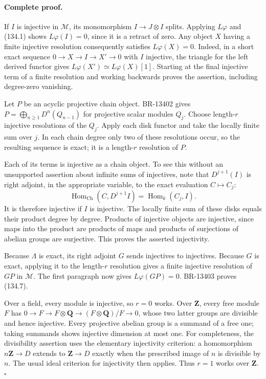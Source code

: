 \paragraph{Complete proof.}
If \(I\) is injective in \(\mathcal M\), its monomorphism
\(I\to J\otimes I\) splits.  Applying \(L\varphi\) and (134.1)
shows \(L\varphi(I)=0\), since it is a retract of zero.  Any object
\(X\) having a finite injective resolution consequently satisfies
\(L\varphi(X)=0\).  Indeed, in a short exact sequence
\(0\to X\to I\to X'\to0\) with \(I\) injective, the triangle for
the left derived functor gives
\(L\varphi(X')\simeq L\varphi(X)[1]\).  Starting at the final
injective term of a finite resolution and working backwards proves
the assertion, including degree-zero vanishing.

Let \(P\) be an acyclic projective chain object.  BR-13402 gives
\(P=\bigoplus_{n\geq1}D^n(Q_{n-1})\) for projective scalar
modules \(Q_j\).  Choose length-\(r\) injective resolutions of the
\(Q_j\).  Apply each disk functor and take the locally finite sum
over \(j\).  In each chain degree only two of these resolutions
occur, so the resulting sequence is exact; it is a length-\(r\)
resolution of \(P\).

Each of its terms is injective as a chain object.  To see this without
an unsupported assertion about infinite sums of injectives, note that
\(D^{j+1}(I)\) is right adjoint, in the appropriate variable, to
the exact evaluation \(C\mapsto C_j\):
\[
 \operatorname{Hom}_{\mathrm{Ch}}(C,D^{j+1}I)
    =\operatorname{Hom}_k(C_j,I).
\]
It is therefore injective if \(I\) is injective.  The locally finite
sum of these disks equals their product degree by degree.  Products
of injective objects are injective, since maps into the product are
products of maps and products of surjections of abelian groups are
surjective.  This proves the asserted injectivity.

Because \(\Lambda\) is exact, its right adjoint \(G\) sends
injectives to injectives.  Because \(G\) is exact, applying it to
the length-\(r\) resolution gives a finite injective resolution of
\(GP\) in \(\mathcal M\).  The first paragraph now gives
\(L\varphi(GP)=0\).  BR-13403 proves (134.7).

Over a field, every module is injective, so \(r=0\) works.  Over
\(\mathbf Z\), every free module \(F\) has
\(0\to F\to F\otimes\mathbf Q\to(F\otimes\mathbf Q)/F\to0\),
whose two latter groups are divisible and hence injective.  Every
projective abelian group is a summand of a free one; taking summands
shows injective dimension at most one.  For completeness, the
divisibility assertion uses the elementary injectivity criterion:
a homomorphism \(n\mathbf Z\to D\) extends to \(\mathbf Z\to D\)
exactly when the prescribed image of \(n\) is divisible by \(n\).
The usual ideal criterion for injectivity then applies.  Thus \(r=1\)
works over \(\mathbf Z\). \(\square\)

